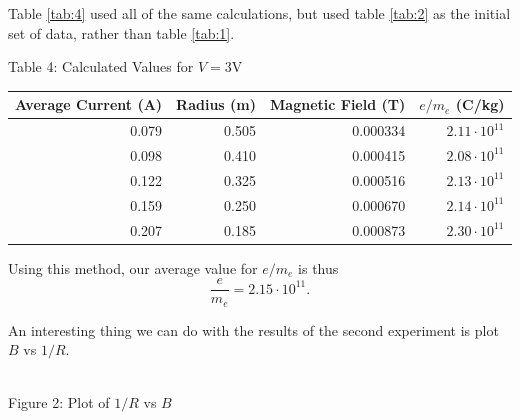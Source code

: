 \documentclass[11pt, letterpaper]{report}
\begin{document}
Table \ref{tab:4} used all of the same calculations, but used table \ref{tab:2} as the initial set of data, rather than table \ref{tab:1}.
\begin{center}
	Table 4: Calculated Values for $V=3$V\label{tab:4}\vspace{5pt}\\
	\begin{tabular}{rrrr}
		\toprule
		Average Current (A)&Radius (m)&Magnetic Field (T)&$e /m_e$ (C/kg)\\
		\midrule
				   0.079&0.505&0.000334&$2.11\cdot 10^{11}$\\
				   0.098&0.410&0.000415&$2.08\cdot 10^{11}$\\
				   0.122&0.325&0.000516&$2.13\cdot 10^{11}$ \\
		     0.159&0.250&0.000670&$2.14\cdot 10^{11}$ \\
		     0.207&0.185&0.000873&$2.30\cdot 10^{11}$ \\
		\bottomrule
	\end{tabular}
\end{center}
Using this method, our average value for $e /m_e$ is thus
\[
	\frac{e}{m_e}=2.15\cdot 10^{11}
.\]

An interesting thing we can do with the results of the second experiment is plot $B$ vs $1 /R$.
\begin{center}
\\
Figure 2: Plot of $1 / R$ vs $B$\label{fig:2}
\end{center}
\end{document}
